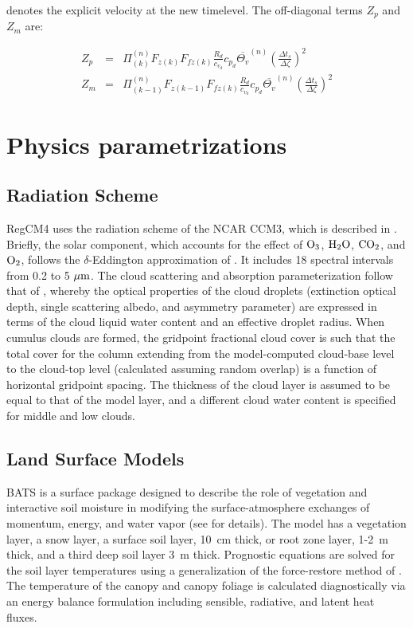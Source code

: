 denotes the explicit velocity at the new timelevel. The off-diagonal terms
$Z_p$ and $Z_m$ are:

\begin{eqnarray}
  Z_p &=& \Pi^{(n)}_{(k)} F_{z (k)} F_{fz(k)} \frac{R_d}{c_{v_d}} c_{p_d}
    \overline{\Theta_v}^{(n)} \left(\frac{\Delta t_{s}}
     {\Delta \zeta}\right)^2 \\
  Z_m &=& \Pi^{(n)}_{(k-1)} F_{z (k-1)} F_{fz(k)} \frac{R_d}{c_{v_d}} c_{p_d}
    \overline{\Theta_v}^{(n)} \left(\frac{\Delta t_{s}}
     {\Delta \zeta}\right)^2
\end{eqnarray}

\section{Physics parametrizations} \label{sec:physics}

\subsection{Radiation Scheme}

\noindent \ac{RegCM}4 uses the radiation scheme of
the \ac{NCAR} CCM3, which is described in \cite{Kiehl_96}.  Briefly, the solar
component, which accounts for the effect of ${\rm O_3}$, ${\rm H_2O}$, ${\rm
CO_2}$, and ${\rm O_2}$, follows the $\delta$-Eddington approximation of
\cite{Kiehl_96}.  It includes 18 spectral intervals from 0.2 to 5 $\mu {\rm m}$.
The cloud scattering and absorption parameterization follow that of
\cite{Slingo_89}, whereby the optical properties of the cloud droplets
(extinction optical depth, single scattering albedo, and asymmetry parameter)
are expressed in terms of the cloud liquid water content and an effective
droplet radius.  When cumulus clouds are formed, the gridpoint fractional cloud
cover is such that the total cover for the column extending from the
model-computed cloud-base level to the cloud-top level (calculated assuming
random overlap) is a function of horizontal gridpoint spacing.  The thickness of
the cloud layer is assumed to be equal to that of the model layer, and a
different cloud water content is specified for middle and low clouds.

\subsection{Land Surface Models}

 BATS is a surface package designed to describe
the role of vegetation and interactive soil moisture in modifying the
surface-atmosphere exchanges of momentum, energy, and water vapor (see
\cite{Dickinson_93} for details).  The model has a vegetation layer, a snow
layer, a surface soil layer, 10~cm thick, or root zone layer, 1-2~m thick, and a
third deep soil layer 3~m thick.  Prognostic equations are solved for the soil
layer temperatures using a generalization of the force-restore method of
\cite{Deardoff_78}.  The temperature of the canopy and canopy foliage is
calculated diagnostically via an energy balance formulation including sensible,
radiative, and latent heat fluxes.

